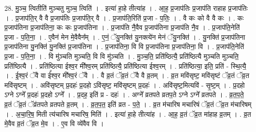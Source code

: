 \documentclass[17pt]{extarticle}
\begin{document}
28. मु॒ञ्च॒ त्वितीति॑ मुञ्चतु मुञ्च॒ त्विति॑ । . इत्या॑ हा॒हे तीत्या॑ह । . आ॒ह॒ प्र॒जाप॑तिः प्र॒जाप॑ति राहाह प्र॒जाप॑तिः । . प्र॒जाप॑ति॒र् वै वै प्र॒जाप॑तिः प्र॒जाप॑ति॒र् वै । . प्र॒जाप॑ति॒रिति॑ प्र॒जा - प॒तिः॒ । . वै कः को वै वै कः । . कः प्र॒जाप॑तिना प्र॒जाप॑तिना॒ कः कः प्र॒जाप॑तिना । . प्र॒जाप॑ति नै॒वैव प्र॒जाप॑तिना प्र॒जाप॑ति नै॒व । . प्र॒जाप॑ति॒नेति॑ प्र॒जा - प॒ति॒ना॒ । . ए॒वैन॑ मेन मे॒वैवैन᳚म् । . ए॒नं॒ ॅयु॒नक्ति॑ यु॒नक्त्ये॑न मेनं ॅयु॒नक्ति॑ । . यु॒नक्ति॑ प्र॒जाप॑तिना प्र॒जाप॑तिना यु॒नक्ति॑ यु॒नक्ति॑ प्र॒जाप॑तिना । . प्र॒जाप॑तिना॒ वि वि प्र॒जाप॑तिना प्र॒जाप॑तिना॒ वि । . प्र॒जाप॑ति॒नेति॑ प्र॒जा - प॒ति॒ना॒ । . वि मु॑ञ्चति मुञ्चति॒ वि वि मु॑ञ्चति । . मु॒ञ्च॒ति॒ प्रति॑ष्ठित्यै॒ प्रति॑ष्ठित्यै मुञ्चति मुञ्चति॒ प्रति॑ष्ठित्यै । . प्रति॑ष्ठित्या ईश्व॒र मी᳚श्व॒रम् प्रति॑ष्ठित्यै॒ प्रति॑ष्ठित्या ईश्व॒रम् । . प्रति॑ष्ठित्या॒ इति॒ प्रति॑ - स्थि॒त्यै॒ । . ई॒श्व॒रं ॅवै वा ई᳚श्व॒र मी᳚श्व॒रं ॅवै । . वै व्र॒तं ॅव्र॒तं ॅवै वै व्र॒तम् । . व्र॒त मवि॑सृष्ट॒ मवि॑सृष्टं ॅव्र॒तं ॅव्र॒त मवि॑सृष्टम् । . अवि॑सृष्टम् प्र॒दहः॑ प्र॒दहो ऽवि॑सृष्ट॒ मवि॑सृष्टम् प्र॒दहः॑ । . अवि॑सृष्ट॒मित्यवि॑ - सृ॒ष्ट॒म् । . प्र॒दहो ऽग्ने ऽग्ने᳚ प्र॒दहः॑ प्र॒दहो ऽग्ने᳚ । . प्र॒दह॒ इति॑ प्र - दहः॑ । . अग्ने᳚ व्रतपते व्रतप॒ते ऽग्ने ऽग्ने᳚ व्रतपते । . व्र॒त॒प॒ते॒ व्र॒तं ॅव्र॒तं ॅव्र॑तपते व्रतपते व्र॒तम् । . व्र॒त॒प॒त॒ इति॑ व्रत - प॒ते॒ । . व्र॒त म॑चारिष मचारिषं ॅव्र॒तं ॅव्र॒त म॑चारिषम् । . अ॒चा॒रि॒ष॒ मिती त्य॑चारिष मचारिष॒ मिति॑ । . इत्या॑ हा॒हे तीत्या॑ह । . आ॒ह॒ व्र॒तं ॅव्र॒त मा॑हाह व्र॒तम् । . व्र॒त मे॒वैव व्र॒तं ॅव्र॒त मे॒व । . ए॒व वि व्ये॑वैव वि । \newline
\end{document}
